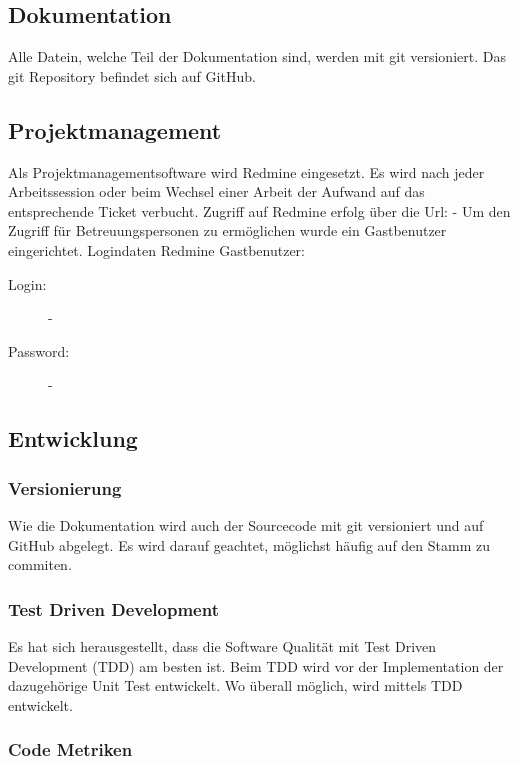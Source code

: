 \documentclass[a4,12pt]{scrartcl}
\begin{document}
\subsection{Dokumentation}
Alle Datein, welche Teil der Dokumentation sind, werden mit git versioniert. Das git Repository befindet sich auf GitHub.
\subsection{Projektmanagement}
Als Projektmanagementsoftware wird Redmine eingesetzt. 
Es wird nach jeder Arbeitssession oder beim Wechsel einer Arbeit der Aufwand auf das entsprechende Ticket verbucht.
Zugriff auf Redmine erfolg über die Url: - %
Um den Zugriff für Betreuungspersonen zu ermöglichen wurde ein Gastbenutzer eingerichtet.
\newline
\newline
Logindaten Redmine Gastbenutzer:
\begin{description}
\begin{description}
\item [Login:]
-
\item [Password:]
-
\end{description}
\end{description}


\subsection{Entwicklung}

\subsubsection{Versionierung}
Wie die Dokumentation wird auch der Sourcecode mit git versioniert und auf GitHub abgelegt. Es wird darauf geachtet, möglichst häufig auf den Stamm zu commiten.
\subsubsection{Test Driven Development}
Es hat sich herausgestellt, dass die Software Qualität mit Test Driven Development (TDD) am besten ist. Beim TDD wird vor der Implementation der dazugehörige Unit Test entwickelt. Wo überall möglich, wird mittels TDD entwickelt.
\subsubsection{Code Metriken}
\end{document}
